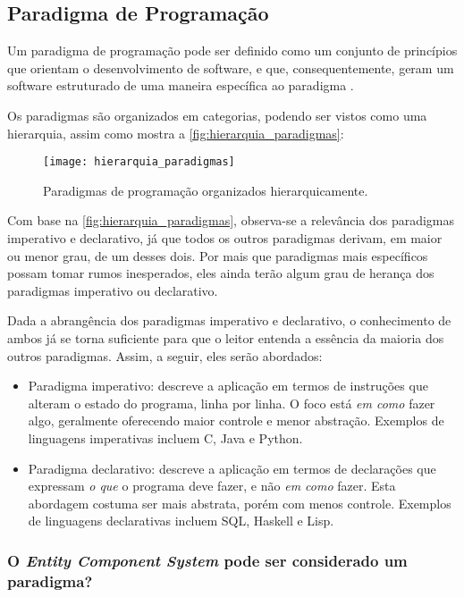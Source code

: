 \subsection{Paradigma de Programação}

Um paradigma de programação pode ser definido como um conjunto de princípios que orientam o desenvolvimento de software, e que, consequentemente, geram um software estruturado de uma maneira específica ao paradigma \cite{programmingparadigmsionos}.

Os paradigmas são organizados em categorias, podendo ser vistos como uma hierarquia, assim como mostra a \autoref{fig:hierarquia_paradigmas}:

\begin{figure}[H]
	\centering
	\texttt{[image: hierarquia\_paradigmas]}
	\caption{Paradigmas de programação organizados hierarquicamente.}
	\label{fig:hierarquia_paradigmas}
\end{figure}

Com base na \autoref{fig:hierarquia_paradigmas}, observa-se a relevância dos paradigmas imperativo e declarativo, já que todos os outros paradigmas derivam, em maior ou menor grau, de um desses dois. Por mais que paradigmas mais específicos possam tomar rumos inesperados, eles ainda terão algum grau de herança dos paradigmas imperativo ou declarativo.

Dada a abrangência dos paradigmas imperativo e declarativo, o conhecimento de ambos já se torna suficiente para que o leitor entenda a essência da maioria dos outros paradigmas. Assim, a seguir, eles serão abordados:

\begin{itemize}
	\item Paradigma imperativo: descreve a aplicação em termos de instruções que alteram o estado do programa, linha por linha. O foco está \textit{em como} fazer algo, geralmente oferecendo maior controle e menor abstração. Exemplos de linguagens imperativas incluem C, Java e Python.
	\item Paradigma declarativo: descreve a aplicação em termos de declarações que expressam \textit{o que} o programa deve fazer, e não \textit{em como} fazer. Esta abordagem costuma ser mais abstrata, porém com menos controle. Exemplos de linguagens declarativas incluem SQL, Haskell e Lisp.
\end{itemize}

\subsubsection{O \textit{Entity Component System} pode ser considerado um paradigma?}

